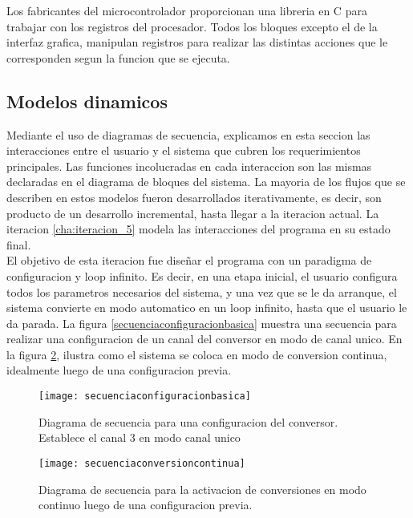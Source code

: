 
Los fabricantes del microcontrolador proporcionan una libreria en C para trabajar con los registros del procesador. Todos los bloques excepto el de la interfaz grafica, manipulan registros para realizar las distintas acciones que le corresponden segun la funcion que se ejecuta.  


\subsection{Modelos dinamicos} %
\label{it2:sub:modelos_dinamicos}

Mediante el uso de diagramas de secuencia, explicamos en esta seccion las interacciones entre el usuario y el sistema que cubren los requerimientos principales. Las funciones incolucradas en cada interaccion son las mismas declaradas en el diagrama de bloques del sistema. La mayoria de los flujos que se describen en estos modelos fueron desarrollados iterativamente, es decir, son producto de un desarrollo incremental, hasta llegar a la iteracion actual. La iteracion \ref{cha:iteracion_5} modela las interacciones del programa en su estado final. \\

El objetivo de esta iteracion fue diseñar el programa con un paradigma de configuracion y loop infinito. Es decir, en una etapa inicial, el usuario configura todos los parametros necesarios del sistema, y una vez que se le da arranque, el sistema convierte en modo automatico en un loop infinito, hasta que el usuario le da parada. La figura \ref{secuenciaconfiguracionbasica} muestra una secuencia para realizar una configuracion de un canal del conversor en modo de canal unico. En la figura \ref{fig:secuenciaconversioncontinua}, ilustra como el sistema se coloca en modo de conversion continua, idealmente luego de una configuracion previa. 

\begin{figure}[h]
  \centering
  \texttt{[image: secuenciaconfiguracionbasica]}
  \caption{Diagrama de secuencia para una configuracion del conversor. Establece el canal 3 en modo canal unico}\label{fig:secuenciaconfiguracionbasica}
\end{figure}

\begin{figure}[h]
  \centering
  \texttt{[image: secuenciaconversioncontinua]}
  \caption{Diagrama de secuencia para la activacion de conversiones en modo continuo luego de una configuracion previa.}\label{fig:secuenciaconversioncontinua}
\end{figure}


